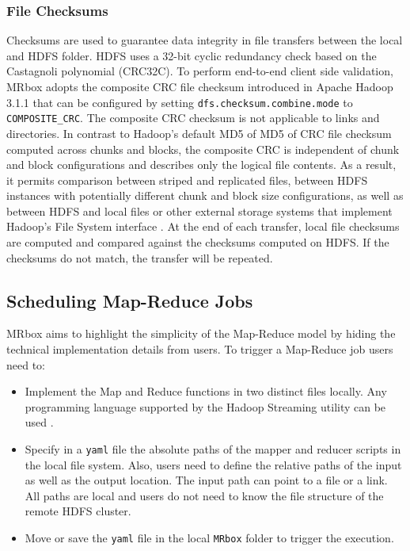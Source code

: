 \subsubsection{File Checksums}
Checksums are used to guarantee data integrity in file transfers between the local and HDFS folder. HDFS uses a 32-bit cyclic redundancy check based on the Castagnoli polynomial (CRC32C). To perform end-to-end client side validation, MRbox adopts the composite CRC file checksum introduced in Apache Hadoop 3.1.1 that can be configured by setting \texttt{dfs.checksum.combine.mode} to \texttt{COMPOSITE\_CRC}. The composite CRC checksum is not applicable to links and directories. In contrast to Hadoop's default MD5 of MD5 of CRC file checksum computed across chunks and blocks, the composite CRC is independent of chunk and block configurations and describes only the logical file contents. As a result, it permits comparison between striped and replicated files, between HDFS instances with potentially different chunk and block size configurations, as well as between HDFS and local files or other external storage systems that implement Hadoop's File System interface \cite{googlecloudcrc,hadoopcrc}. At the end of each transfer, local file checksums are computed and compared against the checksums computed on HDFS. If the checksums do not match, the transfer will be repeated.

\subsection{Scheduling Map-Reduce Jobs}
MRbox aims to highlight the simplicity of the Map-Reduce model by hiding the technical implementation details from users. To trigger a Map-Reduce job users need to:
\begin{itemize}
    \item 
    Implement the Map and Reduce functions in two distinct files locally. Any programming language supported by the Hadoop Streaming utility can be used \cite{hadoopstreaming}.
    \item 
    Specify in a \texttt{yaml} file the absolute paths of the mapper and reducer scripts in the local file system. Also, users need to define the relative paths of the input as well as the output location. The input path can point to a file or a link. All paths are local and users do not need to know the file structure of the remote HDFS cluster.
    \item Move or save the \texttt{yaml} file in the local \texttt{MRbox} folder to trigger the execution.
\end{itemize}

